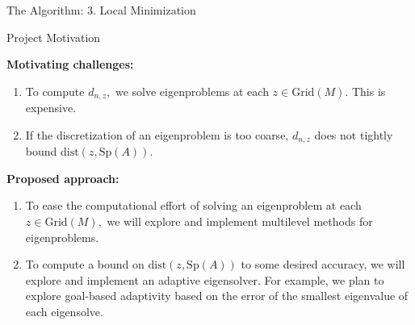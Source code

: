 \documentclass[aspectratio=169]{beamer}
\begin{document}
\begin{frame}{The Algorithm: 3. Local Minimization}


    

    
\end{frame}








\begin{frame}{Project Motivation}

\textbf{Motivating challenges:}
\begin{enumerate}
    \item To compute $d_{n,z},$ we solve eigenproblems at each $z \in \text{Grid}(M).$ This is expensive.
    \vspace{0.5em}
    \item If the discretization of an eigenproblem is too coarse, $d_{n,z}$ does not tightly bound $\text{dist}(z, \text{Sp}(A)).$ 
\end{enumerate}

\vspace{1em}

\textbf{Proposed approach:}
\begin{enumerate}
    \item To ease the computational effort of solving an eigenproblem at each $z \in \text{Grid}(M),$ we will explore and implement multilevel methods for eigenproblems.
    \vspace{0.5em}
    \item To compute a bound on $\text{dist}(z, \text{Sp}(A))$ to some desired accuracy, we will explore and implement an adaptive eigensolver. For example,  we plan to explore goal-based adaptivity based on the error of the smallest eigenvalue of each eigensolve.
\end{enumerate}




\end{frame}
\end{document}
